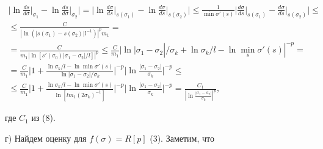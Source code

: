 \begin{multline*}


\bigg|\ln \frac{ds}{d\sigma}\bigg|_{\sigma_1} -


\ln \frac{ds}{d\sigma}\bigg|_{\sigma_2}\bigg| =


\bigg|\ln \frac{d\sigma}{ds}\bigg|_{s(\sigma_1)} -


\ln \frac{d\sigma}{ds}\bigg|_{s(\sigma_2)}\bigg| \leq


\frac{1}{\min \sigma'(s)} \bigg|\frac{d\sigma}{ds}\bigg|_{s(\sigma_1)} -


\frac{d\sigma}{ds}\bigg|_{s(\sigma_2)}\bigg| \leq \\


%


\leq \frac{C}{|\ln(|s(\sigma_1) -


s(\sigma_2)|l^{-1})|^p m_1} = \\


%


= \frac{C}{m_1|\ln [s'(\sigma_0)|\sigma_1 - \sigma_2|/l]|^p} \leq


\frac{C}{m_1} |\ln |\sigma_1 - \sigma_2|/\sigma_k + \ln


\sigma_k/l - \ln \min_s \sigma'(s)|^{-p} = \\


%


= \frac{C}{m_1} \bigg|1 +


\frac{\ln \sigma_k/l - \ln \min \sigma'(s)}{\ln |\sigma_1 -


\sigma_2|/\sigma_k}\bigg|^{-p} \bigg|\ln \frac{|\sigma_1 -


\sigma_2|}{\sigma_k}\bigg|^{-p} \leq \\


%


\leq \frac{C}{m_1} \bigg|1 + \frac{\ln \sigma_k/l - \ln \min


\sigma'(s)}{\ln [lm_1(2\sigma_k)^{-1}]}\bigg|^{-p} \bigg|\ln \frac{|\sigma_1 -


\sigma_2|}{\sigma_k}\bigg|^{-p} =


\frac{C_1}{|\ln\frac{|\sigma_1 -


\sigma_2|}{\sigma_k}|^p},


\end{multline*}


где $C_1$ из (8).





г) Найдем оценку для $f(\sigma) = R[p]$ (3). Заметим, что


